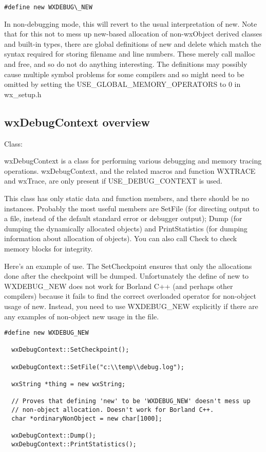 \begin{verbatim}
#define new WXDEBUG\_NEW
\end{verbatim}

In non-debugging mode, this will revert to the usual interpretation
of new. Note that for this not to mess up new-based allocation of non-wxObject derived classes and
built-in types, there are global definitions of new and delete which match
the syntax required for storing filename and line numbers. These merely
call malloc and free, and so do not do anything interesting. The definitions
may possibly cause multiple symbol problems for some compilers and so might
need to be omitted by setting the USE\_GLOBAL\_MEMORY\_OPERATORS to 0 in wx\_setup.h

\subsection{wxDebugContext overview}\label{wxdebugcontextoverview}


Class: 

wxDebugContext is a class for performing various debugging and memory tracing
operations. wxDebugContext, and the related macros and function WXTRACE and
wxTrace, are only present if USE\_DEBUG\_CONTEXT is used.

This class has only static data and function members, and there should be
no instances. Probably the most useful members are SetFile (for directing output
to a file, instead of the default standard error or debugger output);
Dump (for dumping the dynamically allocated objects) and PrintStatistics
(for dumping information about allocation of objects). You can also call
Check to check memory blocks for integrity.

Here's an example of use. The SetCheckpoint ensures that only the
allocations done after the checkpoint will be dumped. Unfortunately
the define of new to WXDEBUG\_NEW does not work for Borland C++ (and
perhaps other compilers) because it fails to find the correct overloaded
operator for non-object usage of new. Instead, you need to use WXDEBUG\_NEW
explicitly if there are any examples of non-object new usage in the file.

\begin{verbatim}
#define new WXDEBUG_NEW

  wxDebugContext::SetCheckpoint();

  wxDebugContext::SetFile("c:\\temp\\debug.log");

  wxString *thing = new wxString;

  // Proves that defining 'new' to be 'WXDEBUG_NEW' doesn't mess up
  // non-object allocation. Doesn't work for Borland C++.
  char *ordinaryNonObject = new char[1000];

  wxDebugContext::Dump();
  wxDebugContext::PrintStatistics();
\end{verbatim}

